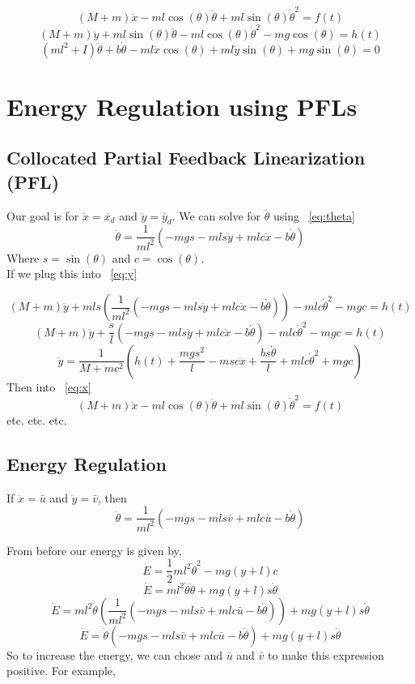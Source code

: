 \documentclass{article}
\begin{document}
\begin{equation} \label{eq:x}
(M+m)\ddot{x} - ml\cos(\theta)\ddot{\theta} + ml\sin(\theta)\dot{\theta}^2 = f(t) 
\end{equation}
\begin{equation} \label{eq:y}
(M+m)\ddot{y} + ml\sin(\theta)\ddot{\theta} - ml\cos(\theta)\dot{\theta}^2 - mg\cos(\theta) = h(t)
\end{equation}
\begin{equation} \label{eq:theta}
(ml^2 + I)\ddot{\theta} + b \dot{\theta} -ml\ddot{x}\cos(\theta) +ml\ddot{y}\sin(\theta) + mg\sin(\theta)= 0
\end{equation}

\section{Energy Regulation using PFLs}

\subsection{Collocated Partial Feedback Linearization (PFL)}

Our goal is for $\ddot{x} = \ddot{x_d}$ and $\ddot{y} = \ddot{y_d}$. We can solve for $\ddot{\theta}$ using ~\ref{eq:theta}
$$
\ddot{\theta} = \frac{1}{ml^2} (-mgs -mls\ddot{y} +mlc\ddot{x} -b\dot{\theta})
$$
Where $s = \sin(\theta)$ and $c= \cos(\theta)$. \\
\noindent
If we plug this into ~\ref{eq:y} 

$$
(M+m)\ddot{y} + mls(\frac{1}{ml^2} (-mgs -mls\ddot{y} +mlc\ddot{x} -b\dot{\theta})) - mlc\dot{\theta}^2 - mgc = h(t)
$$
$$
(M+m)\ddot{y} + \frac{s}{l} (-mgs -mls\ddot{y} +mlc\ddot{x} -b\dot{\theta}) - mlc\dot{\theta}^2 - mgc = h(t)
$$
$$
\ddot{y} = \frac{1}{M+mc^2} (h(t)+\frac{mgs^2}{l}-msc\ddot{x}+\frac{bs\dot{\theta}}{l}+mlc\dot{\theta}^2+mgc)
$$
Then into ~\ref{eq:x} 
$$
(M+m)\ddot{x} - ml\cos(\theta)\ddot{\theta} + ml\sin(\theta)\dot{\theta}^2 = f(t) 
$$
etc. etc. etc.

\subsection{Energy Regulation}

If $\ddot{x} = \bar{u}$ and $\ddot{y} = \bar{v}$, then 
$$
\ddot{\theta} = \frac{1}{ml^2} (-mgs -mls\bar{v} +mlc\bar{u} -b\dot{\theta})
$$

From before our energy is given by,
$$
E =  \frac{1}{2} ml^2\dot{\theta}^2 -  mg(y+l)c
$$
$$
\dot{E} = ml^2 \dot{\theta}\ddot{\theta} + mg(y+l)s\dot{\theta}
$$
$$
\dot{E} = ml^2 \dot{\theta}(\frac{1}{ml^2} (-mgs -mls\bar{v} +mlc\bar{u} -b\dot{\theta})) + mg(y+l)s\dot{\theta}
$$
$$
\dot{E} = \dot{\theta}(-mgs -mls\bar{v} +mlc\bar{u} -b\dot{\theta}) + mg(y+l)s\dot{\theta}
$$
So to increase the energy, we can chose and $\bar{u}$ and $\bar{v}$ to make this expression positive. For example,
\end{document}
